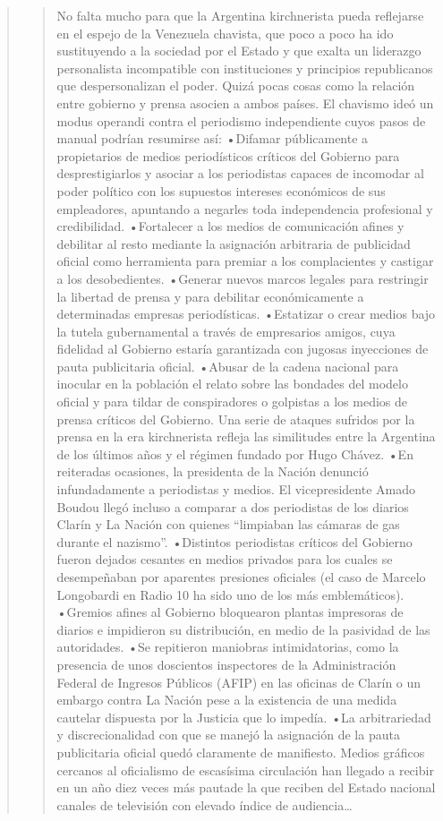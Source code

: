 \begin{quote}
\begin{quote}
	No falta mucho para que la Argentina kirchnerista pueda reflejarse en el espejo de la Venezuela chavista, que poco a poco ha ido sustituyendo a la sociedad por el Estado y que exalta un liderazgo personalista incompatible con instituciones y principios republicanos que despersonalizan el poder. Quizá pocas cosas como la relación entre gobierno y prensa asocien a ambos países. El chavismo ideó un modus operandi contra el periodismo independiente cuyos pasos de manual podrían resumirse así: •Difamar públicamente a propietarios de medios periodísticos críticos del Gobierno para desprestigiarlos y asociar a los periodistas capaces de incomodar al poder político con los supuestos intereses económicos de sus empleadores, apuntando a negarles toda independencia profesional y credibilidad. •Fortalecer a los medios de comunicación afines y debilitar al resto mediante la asignación arbitraria de publicidad oficial como herramienta para premiar a los complacientes y castigar a los desobedientes. •Generar nuevos marcos legales para restringir la libertad de prensa y para debilitar económicamente a determinadas empresas periodísticas. •Estatizar o crear medios bajo la tutela gubernamental a través de empresarios amigos, cuya fidelidad al Gobierno estaría garantizada con jugosas inyecciones de pauta publicitaria oficial. •Abusar de la cadena nacional para inocular en la población el relato sobre las bondades del modelo oficial y para tildar de conspiradores o golpistas a los medios de prensa críticos del Gobierno. Una serie de ataques sufridos por la prensa en la era kirchnerista refleja las similitudes entre la Argentina de los últimos años y el régimen fundado por Hugo Chávez. •En reiteradas ocasiones, la presidenta de la Nación denunció infundadamente a periodistas y medios. El vicepresidente Amado Boudou llegó incluso a comparar a dos periodistas de los diarios Clarín y La Nación con quienes \enquote{limpiaban las cámaras de gas durante el nazismo}. •Distintos periodistas críticos del Gobierno fueron dejados cesantes en medios privados para los cuales se desempeñaban por aparentes presiones oficiales (el caso de Marcelo Longobardi en Radio 10 ha sido uno de los más emblemáticos). •Gremios afines al Gobierno bloquearon plantas impresoras de diarios e impidieron su distribución, en medio de la pasividad de las autoridades. •Se repitieron maniobras intimidatorias, como la presencia de unos doscientos inspectores de la Administración Federal de Ingresos Públicos (AFIP) en las oficinas de Clarín o un embargo contra La Nación pese a la existencia de una medida cautelar dispuesta por la Justicia que lo impedía. •La arbitrariedad y discrecionalidad con que se manejó la asignación de la pauta publicitaria oficial quedó claramente de manifiesto. Medios gráficos cercanos al oficialismo de escasísima circulación han llegado a recibir en un año diez veces más pautade la que reciben del Estado nacional canales de televisión con elevado índice de audiencia\dots
\end{quote}



\end{quote}
